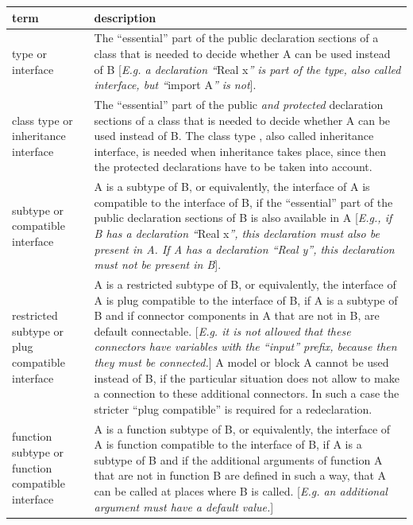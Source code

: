 \documentclass[10pt,a4paper]{report}
\begin{document}
\begin{longtable}{|p{4cm}|p{8cm}|} \hline
\textbf{term} & \textbf{description}\\ \hline
type or interface
& The ``essential'' part of the public declaration sections of a class
that is needed to decide whether A can be used instead of B
{[}\emph{E.g. a declaration ``}Real x\emph{'' is part of the type, also
called interface, but ``}import A\emph{'' is not}{]}.
\\ \hline
class type or\newline
inheritance interface& 
The ``essential'' part of the public \emph{and protected} declaration
sections of a class that is needed to decide whether A can be used
instead of B. The class type , also called inheritance interface, is
needed when inheritance takes place, since then the protected
declarations have to be taken into account.\\ \hline
subtype or\newline
compatible interface & 
A is a subtype of B, or equivalently, the interface of A is compatible
to the interface of B, if the ``essential'' part of the public
declaration sections of B is also available in A {[}\emph{E.g., if B has
a declaration ``}Real x\emph{'', this declaration must also be present
in A. If A has a declaration ``Real y'', this declaration must not be
present in B}{]}.\\ \hline
restricted subtype or\newline
plug compatible interface & 
A is a restricted subtype of B, or equivalently, the interface of A is
plug compatible to the interface of B, if A is a subtype of B and if
connector components in A that are not in B, are default connectable.
{[}\emph{E.g. it is not allowed that these connectors have variables
with the ``input'' prefix, because then they must be connected.}{]} A
model or block A cannot be used instead of B, if the particular
situation does not allow to make a connection to these additional
connectors. In such a case the stricter ``plug compatible'' is required
for a redeclaration.\\ \hline
function subtype or\newline
function compatible interface & 
A is a function subtype of B, or equivalently, the interface of A is
function compatible to the interface of B, if A is a subtype of B and if
the additional arguments of function A that are not in function B are
defined in such a way, that A can be called at places where B is called.
{[}\emph{E.g. an additional argument must have a default
value.}{]}\\ \hline
\end{longtable}
\end{document}
